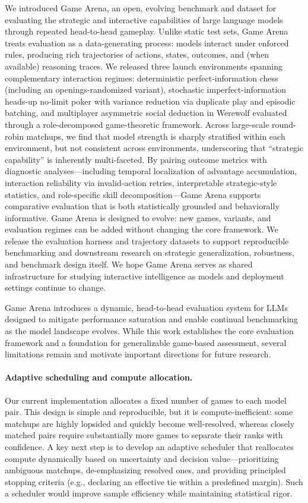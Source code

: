 \documentclass{article}
\begin{document}
\setlength{\parskip}{0pt} 
We introduced Game Arena, an open, evolving benchmark and dataset for evaluating the strategic and interactive capabilities of large language models through repeated head-to-head gameplay. Unlike static test sets, Game Arena treats evaluation as a data-generating process: models interact under enforced rules, producing rich trajectories of actions, states, outcomes, and (when available) reasoning traces. We released three launch environments spanning complementary interaction regimes: deterministic perfect-information chess (including an openings-randomized variant), stochastic imperfect-information heads-up no-limit poker with variance reduction via duplicate play and episodic batching, and multiplayer asymmetric social deduction in Werewolf evaluated through a role-decomposed game-theoretic framework.
Across large-scale round-robin matchups, we find that model strength is sharply stratified within each environment, but not consistent across environments, underscoring that “strategic capability” is inherently multi-faceted. By pairing outcome metrics with diagnostic analyses—including temporal localization of advantage accumulation, interaction reliability via invalid-action retries, interpretable strategic-style statistics, and role-specific skill decomposition—Game Arena supports comparative evaluation that is both statistically grounded and behaviorally informative.
Game Arena is designed to evolve: new games, variants, and evaluation regimes can be added without changing the core framework. We release the evaluation harness and trajectory datasets to support reproducible benchmarking and downstream research on strategic generalization, robustness, and benchmark design itself. We hope Game Arena serves as shared infrastructure for studying interactive intelligence as models and deployment settings continue to change.

Game Arena introduces a dynamic, head-to-head evaluation system for LLMs designed to mitigate performance saturation and enable continual benchmarking as the model landscape evolves. While this work establishes the core evaluation framework and a foundation for generalizable game-based assessment, several limitations remain and motivate important directions for future research.

\paragraph{Adaptive scheduling and compute allocation.}
Our current implementation allocates a fixed number of games to each model pair. This design is simple and reproducible, but it is compute-inefficient: some matchups are highly lopsided and quickly become well-resolved, whereas closely matched pairs require substantially more games to separate their ranks with confidence. A key next step is to develop an adaptive scheduler that reallocates compute dynamically based on uncertainty and decision value---prioritizing ambiguous matchups, de-emphasizing resolved ones, and providing principled stopping criteria (e.g., declaring an effective tie within a predefined margin). Such a scheduler would improve sample efficiency while maintaining statistical rigor.
\end{document}
